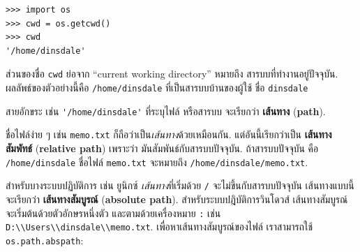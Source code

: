 \begin{verbatim}
>>> import os
>>> cwd = os.getcwd()
>>> cwd
'/home/dinsdale'
\end{verbatim}
%
%
ส่วนของชื่อ \texttt{cwd} ย่อจาก ``current working directory'' หมายถึง สารบบที่ทำงานอยู่ปัจจุบัน.
ผลลัพธ์ของตัวอย่างนี้คือ \texttt{/home/dinsdale}
ที่เป็นสารบบบ้านของผู้ใช้ ชื่อ \texttt{dinsdale}


สายอักขระ เช่น \verb|'/home/dinsdale'| ที่ระบุไฟล์ หรือสารบบ
จะเรียกว่า \textbf{เส้นทาง} (\textbf{path}).


ชื่อไฟล์ง่าย ๆ เช่น \texttt{memo.txt} ก็ถือว่าเป็น\textit{เส้นทาง}ด้วยเหมือนกัน.
แต่อันนี้เรียกว่าเป็น \textbf{เส้นทางสัมพัทธ์} (\textbf{relative path})
เพราะว่า มันสัมพันธ์กับสารบบปัจจุบัน.
ถ้าสารบบปัจจุบัน คือ \texttt{/home/dinsdale}
ชื่อไฟล์ \texttt{memo.txt} จะหมายถึง
\texttt{/home/dinsdale/memo.txt}.
 
 
 
 


สำหรับบางระบบปฏิบัติการ เช่น ยูนิกซ์
\textit{เส้นทาง}ที่เริ่มด้วย \texttt{/}
จะไม่ขึ้นกับสารบบปัจจุบัน
เส้นทางแบบนี้ จะเรียกว่า \textbf{เส้นทางสัมบูรณ์} (\textbf{absolute path}).
%
สำหรับระบบปฎิบัติการวินโดวส์
เส้นทางสัมบูรณ์ จะเริ่มต้นด้วยตัวอักษรหนึ่งตัว
และตามด้วยเครื่องหมาย \texttt{:} เช่น \verb|D:\\Users\\dinsdale\\memo.txt|.
%
เพื่อหาเส้นทางสัมบูรณ์ของไฟล์
เราสามารถใช้ \texttt{os.path.abspath}:

